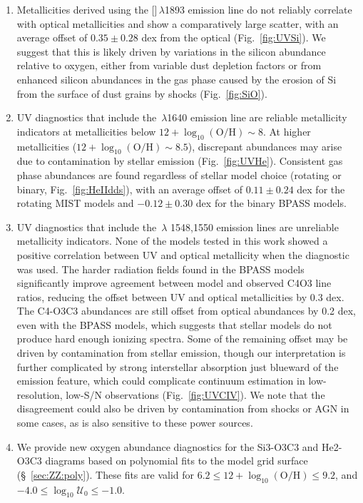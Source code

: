 \documentclass[preprint2]{aastex62}
\newcommand{\heii}{\ion{He}{2}}
\newcommand{\civ}{\ion{C}{4}}
\newcommand{\SiuIII}{[\ion{Si}{3}]}
\newcommand{\logten}{\ensuremath{\log_{10}}}
\newcommand{\logOH}{\ensuremath{\logten (\mathrm{O}/\mathrm{H})}\xspace}
\newcommand{\logU}{\ensuremath{\logten \mathcal{U}_0}}
\begin{document}
\begin{enumerate}
    \item Metallicities derived using the \SiuIII$\,\lambda$1893 emission line do not reliably correlate with optical metallicities and show a comparatively large scatter, with an average offset of $0.35 \pm 0.28$ dex from the optical (Fig.~\ref{fig:UVSi}). We suggest that this is likely driven by variations in the silicon abundance relative to oxygen, either from variable dust depletion factors or from enhanced silicon abundances in the gas phase caused by the erosion of Si from the surface of dust grains by shocks (Fig.~\ref{fig:SiO}).
    \item UV diagnostics that include the \heii$\,\lambda$1640 emission line are reliable metallicity indicators at metallicities below $12+\logOH \sim 8$. At higher metallicities ($12+\logOH \sim 8.5$), discrepant abundances may arise due to contamination by stellar \heii{} emission (Fig.~\ref{fig:UVHe}). Consistent gas phase abundances are found regardless of stellar model choice (rotating or binary, Fig.~\ref{fig:HeIIdds}), with an average offset of $0.11 \pm 0.24$ dex for the rotating MIST models and $-0.12 \pm 0.30$ dex for the binary BPASS models.
    \item UV diagnostics that include the \civ$\,\lambda$ 1548,1550 emission lines are unreliable metallicity indicators. None of the models tested in this work showed a positive correlation between UV and optical metallicity when the \civ{} diagnostic was used. The harder radiation fields found in the BPASS models significantly improve agreement between model and observed C4O3 line ratios, reducing the offset between UV and optical metallicities by 0.3 dex. The C4-O3C3 abundances are still offset from optical abundances by 0.2 dex, even with the BPASS models, which suggests that stellar models do not produce hard enough ionizing spectra. Some of the remaining offset may be driven by contamination from stellar emission, though our interpretation is further complicated by strong interstellar absorption just blueward of the emission feature, which could complicate continuum estimation in low-resolution, low-S/N observations (Fig.~\ref{fig:UVCIV}). We note that the disagreement could also be driven by contamination from shocks or AGN in some cases, as \civ{} is also sensitive to these power sources. 
    \item We provide new oxygen abundance diagnostics for the Si3-O3C3 and He2-O3C3 diagrams based on polynomial fits to the model grid surface (\S~\ref{sec:ZZ:poly}). These fits are valid for $6.2 \leq 12+\logOH \leq 9.2$, and $-4.0 \leq \logU \leq -1.0$.

\end{enumerate}
\end{document}
